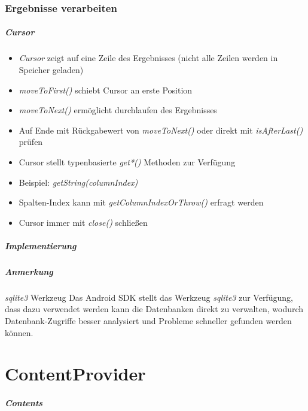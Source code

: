 \section{Ergebnisse verarbeiten}
\begin{frame}
   \frametitle{Cursor}
   \begin{itemize}
   	\item \emph{Cursor} zeigt auf eine Zeile des Ergebnisses (nicht alle 
   		Zeilen werden in Speicher geladen)
   	\item \emph{moveToFirst()} schiebt Cursor an erste Position
   	\item \emph{moveToNext()} ermöglicht durchlaufen des Ergebnisses
   	\item Auf Ende mit Rückgabewert von \emph{moveToNext()} oder 
			direkt mit \emph{isAfterLast()} prüfen
   	\item Cursor stellt typenbasierte \emph{get*()} Methoden zur Verfügung
   	\item Beispiel: \emph{getString(columnIndex)}
   	\item Spalten-Index kann mit \emph{getColumnIndexOrThrow()} 
   		erfragt werden
   	\item Cursor immer mit \emph{close()} schließen
   \end{itemize}
\end{frame}

\begin{frame}
   \frametitle{Implementierung}
	
\end{frame}

\begin{frame}
   \frametitle{Anmerkung}
   \begin{alertblock}{\emph{sqlite3} Werkzeug}
		Das Android SDK stellt das Werkzeug \emph{sqlite3} zur Verfügung, dass dazu verwendet 
		werden kann die Datenbanken direkt zu verwalten, wodurch Datenbank-Zugriffe 
		besser analysiert und Probleme schneller gefunden werden können.
	\end{alertblock}
\end{frame}

\part{ContentProvider}
\frame{\partpage}
\begin{frame}
	\frametitle{Contents}
	\tableofcontents[]
\end{frame}


